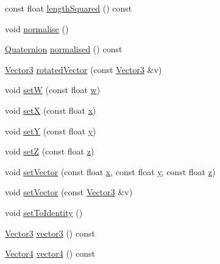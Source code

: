 \begin{DoxyCompactItemize}
\item 
const float \hyperlink{classprism_1_1_quaternion_a9b12ad0b7d021d0116e3a2c29a0ecd88}{length\+Squared} () const 
\item 
void \hyperlink{classprism_1_1_quaternion_adce2473719f015c5e8def79cacf4a37c}{normalise} ()
\item 
\hyperlink{classprism_1_1_quaternion}{Quaternion} \hyperlink{classprism_1_1_quaternion_ac9e4890f0614242dbcf2162b23dc483c}{normalised} () const 
\item 
\hyperlink{classprism_1_1_vector3}{Vector3} \hyperlink{classprism_1_1_quaternion_a042b07658410ce868af8ede1cab913b7}{rotated\+Vector} (const \hyperlink{classprism_1_1_vector3}{Vector3} \&v)
\item 
void \hyperlink{classprism_1_1_quaternion_ae639779c2c76874f1d2b3f04aa93f103}{setW} (const float \hyperlink{classprism_1_1_quaternion_aa930b57c8fbba2855722e82080a23cce}{w})
\item 
void \hyperlink{classprism_1_1_quaternion_a66751ee34eab5f4c77e51c018a0001ff}{setX} (const float \hyperlink{classprism_1_1_quaternion_ab3f80fc41a933a371b2861363997ce22}{x})
\item 
void \hyperlink{classprism_1_1_quaternion_ab3db803a8e07017514050bd550ea3e70}{setY} (const float \hyperlink{classprism_1_1_quaternion_a37023ce86684cb19287ec52cf27072f7}{y})
\item 
void \hyperlink{classprism_1_1_quaternion_a92e76b72fd75a6671431f0a2de2a6af2}{setZ} (const float \hyperlink{classprism_1_1_quaternion_a8af7b070028c48f61d1a76b1b49cbaac}{z})
\item 
void \hyperlink{classprism_1_1_quaternion_aabc3e1fd8b643857d206469980b4dff9}{set\+Vector} (const float \hyperlink{classprism_1_1_quaternion_ab3f80fc41a933a371b2861363997ce22}{x}, const float \hyperlink{classprism_1_1_quaternion_a37023ce86684cb19287ec52cf27072f7}{y}, const float \hyperlink{classprism_1_1_quaternion_a8af7b070028c48f61d1a76b1b49cbaac}{z})
\item 
void \hyperlink{classprism_1_1_quaternion_a2a3e3eefffb49c99b6d70d5d299b70e8}{set\+Vector} (const \hyperlink{classprism_1_1_vector3}{Vector3} \&v)
\item 
void \hyperlink{classprism_1_1_quaternion_a008a684b930b6e66f19317696fa47d71}{set\+To\+Identity} ()
\item 
\hyperlink{classprism_1_1_vector3}{Vector3} \hyperlink{classprism_1_1_quaternion_af6ca1a6e1e008c4ad06e2a1306a1edc6}{vector3} () const 
\item 
\hyperlink{classprism_1_1_vector4}{Vector4} \hyperlink{classprism_1_1_quaternion_af0d5601930898339edbfcc2f2d55bb4f}{vector4} () const 

\end{DoxyCompactItemize}
